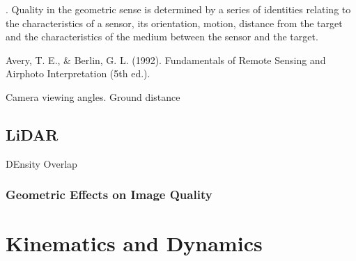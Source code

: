  \cite{Gupta2018}. 
Quality in the geometric sense is determined by a series of identities relating to the characteristics of a sensor, its orientation, motion, distance from the target and the characteristics of the medium between the sensor and the target.

\cite{Avery1992}
Avery, T. E., \& Berlin, G. L. (1992). Fundamentals of Remote Sensing and Airphoto Interpretation (5th ed.).

Camera viewing angles.
Ground distance





\subsection{LiDAR}

DEnsity
Overlap


\subsubsection{Geometric Effects on Image Quality}


\section{Kinematics and Dynamics}







